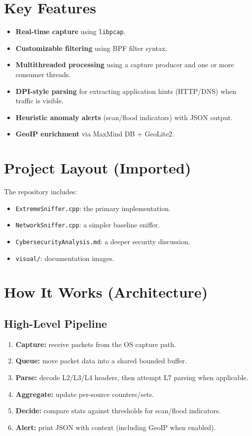 \documentclass[14pt]{extarticle}
\begin{document}
\section{Key Features}
\begin{itemize}
  \item \textbf{Real-time capture} using \texttt{libpcap}.\cite{libpcap}
  \item \textbf{Customizable filtering} using BPF filter syntax.\cite{bpf}
  \item \textbf{Multithreaded processing} using a capture producer and one or more consumer threads.
  \item \textbf{DPI-style parsing} for extracting application hints (HTTP/DNS) when traffic is visible.
  \item \textbf{Heuristic anomaly alerts} (scan/flood indicators) with JSON output.
  \item \textbf{GeoIP enrichment} via MaxMind DB + GeoLite2.\cite{maxminddb,geolite2}
\end{itemize}

\section{Project Layout (Imported)}
The repository includes:
\begin{itemize}
  \item \texttt{ExtremeSniffer.cpp}: the primary implementation.
  \item \texttt{NetworkSniffer.cpp}: a simpler baseline sniffer.
  \item \texttt{CybersecurityAnalysis.md}: a deeper security discussion.
  \item \texttt{visual/}: documentation images.
\end{itemize}

\section{How It Works (Architecture)}
\subsection{High-Level Pipeline}
\begin{enumerate}
  \item \textbf{Capture:} receive packets from the OS capture path.
  \item \textbf{Queue:} move packet data into a shared bounded buffer.
  \item \textbf{Parse:} decode L2/L3/L4 headers, then attempt L7 parsing when applicable.
  \item \textbf{Aggregate:} update per-source counters/sets.
  \item \textbf{Decide:} compare stats against thresholds for scan/flood indicators.
  \item \textbf{Alert:} print JSON with context (including GeoIP when enabled).
\end{enumerate}
\end{document}
